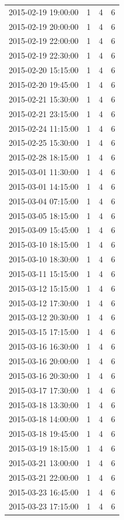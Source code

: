 \begin{tabular}{lrrr}
2015-02-19 19:00:00 & 1 & 4 & 6 \\
2015-02-19 20:00:00 & 1 & 4 & 6 \\
2015-02-19 22:00:00 & 1 & 4 & 6 \\
2015-02-19 22:30:00 & 1 & 4 & 6 \\
2015-02-20 15:15:00 & 1 & 4 & 6 \\
2015-02-20 19:45:00 & 1 & 4 & 6 \\
2015-02-21 15:30:00 & 1 & 4 & 6 \\
2015-02-21 23:15:00 & 1 & 4 & 6 \\
2015-02-24 11:15:00 & 1 & 4 & 6 \\
2015-02-25 15:30:00 & 1 & 4 & 6 \\
2015-02-28 18:15:00 & 1 & 4 & 6 \\
2015-03-01 11:30:00 & 1 & 4 & 6 \\
2015-03-01 14:15:00 & 1 & 4 & 6 \\
2015-03-04 07:15:00 & 1 & 4 & 6 \\
2015-03-05 18:15:00 & 1 & 4 & 6 \\
2015-03-09 15:45:00 & 1 & 4 & 6 \\
2015-03-10 18:15:00 & 1 & 4 & 6 \\
2015-03-10 18:30:00 & 1 & 4 & 6 \\
2015-03-11 15:15:00 & 1 & 4 & 6 \\
2015-03-12 15:15:00 & 1 & 4 & 6 \\
2015-03-12 17:30:00 & 1 & 4 & 6 \\
2015-03-12 20:30:00 & 1 & 4 & 6 \\
2015-03-15 17:15:00 & 1 & 4 & 6 \\
2015-03-16 16:30:00 & 1 & 4 & 6 \\
2015-03-16 20:00:00 & 1 & 4 & 6 \\
2015-03-16 20:30:00 & 1 & 4 & 6 \\
2015-03-17 17:30:00 & 1 & 4 & 6 \\
2015-03-18 13:30:00 & 1 & 4 & 6 \\
2015-03-18 14:00:00 & 1 & 4 & 6 \\
2015-03-18 19:45:00 & 1 & 4 & 6 \\
2015-03-19 18:15:00 & 1 & 4 & 6 \\
2015-03-21 13:00:00 & 1 & 4 & 6 \\
2015-03-21 22:00:00 & 1 & 4 & 6 \\
2015-03-23 16:45:00 & 1 & 4 & 6 \\
2015-03-23 17:15:00 & 1 & 4 & 6 \\

\end{tabular}
